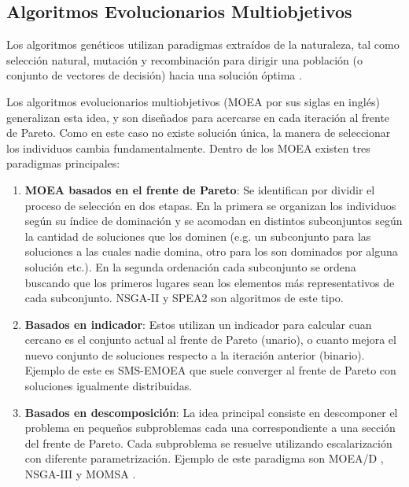 \subsection{Algoritmos Evolucionarios Multiobjetivos }

Los algoritmos gen\'eticos utilizan paradigmas extra\'idos de la naturaleza, tal como selecci\'on natural, mutaci\'on y recombinaci\'on para dirigir una poblaci\'on (o conjunto de vectores de decisi\'on) hacia una soluci\'on \'optima .

Los algoritmos evolucionarios multiobjetivos (MOEA por sus siglas en ingl\'es) generalizan esta idea, y son diseñados para acercarse en cada iteraci\'on  al frente de Pareto. Como en este caso no existe soluci\'on \'unica, la manera de seleccionar los individuos cambia fundamentalmente. Dentro de los MOEA existen tres paradigmas principales:

\begin{enumerate}
    \item \textbf{MOEA basados en el frente de Pareto}\label{background:def:MOEA}: Se identifican por dividir el proceso de selecci\'on en dos etapas. En la primera se organizan los individuos seg\'un su \'indice de dominaci\'on y se acomodan en distintos subconjuntos seg\'un la cantidad de soluciones que los dominen (e.g. un subconjunto para las soluciones a las cuales nadie domina, otro para los son dominados por alguna soluci\'on etc.). En la segunda ordenaci\'on cada subconjunto se ordena buscando que los primeros lugares sean los elementos m\'as representativos de cada subconjunto. NSGA-II  y SPEA2  son algoritmos de este tipo.

    \item \textbf{Basados en indicador}: Estos utilizan un indicador para calcular cuan cercano es el conjunto actual al frente de Pareto (unario), o cuanto mejora el nuevo conjunto de soluciones respecto a la iteraci\'on anterior (binario). Ejemplo de este es SMS-EMOEA  que suele converger al frente de Pareto con soluciones igualmente distribuidas.

    \item \textbf{Basados en descomposici\'on}: La idea principal consiste en descomponer el problema en pequeños subproblemas cada una correspondiente a una secci\'on del frente de Pareto. Cada subproblema se resuelve utilizando escalarizaci\'on con diferente parametrizaci\'on. 
        Ejemplo de este paradigma son MOEA/D , NSGA-III  y MOMSA .

\end{enumerate}

